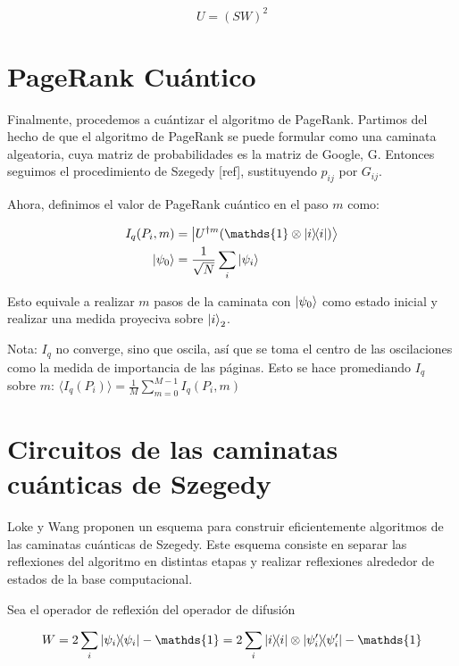 \begin{equation}
    U = (S W)^2
\end{equation}

\section{PageRank Cuántico}

Finalmente, procedemos a cuántizar el algoritmo de PageRank. Partimos del hecho de que el algoritmo de PageRank se puede formular como una caminata algeatoria, cuya matriz de probabilidades es la matriz de Google, G. Entonces seguimos el procedimiento de Szegedy [ref], sustituyendo $p_{i j}$ por $G_{i j}$.

Ahora, definimos el valor de PageRank cuántico en el paso $m$ como:

\color{red}
\begin{align*}
I_q(P_i,m) &= \ket{U^{\dagger m}(\mathds{1} \otimes \ketbra{i}{i})} \\
\ket{\psi_0} &= \frac{1}{\sqrt{N}} \sum\limits_i \ket{\psi_i}
\end{align*}
\color{black}

Esto equivale a realizar $m$ pasos de la caminata con $\ket{\psi_0}$ como estado inicial y realizar una medida proyeciva sobre $\ket{i}_2$.

Nota: $I_q$ no converge, sino que oscila, así que se toma el centro de las oscilaciones como la medida de importancia de las páginas. Esto se hace promediando $I_q$ sobre $m$: $\langle I_q(P_i) \rangle = \frac{1}{M} \sum\limits_{m=0}^{M-1} I_q(P_i,m)$ 

\section{Circuitos de las caminatas cuánticas de Szegedy}

Loke y Wang \cite{loke} proponen un esquema para construir eficientemente algoritmos de las caminatas cuánticas de Szegedy. Este esquema consiste en separar las reflexiones del algoritmo en distintas etapas y realizar reflexiones alrededor de estados de la base computacional.

Sea el operador de reflexión del operador de difusión

\begin{equation}
    W = 2 \sum\limits_i \ketbra{\psi_i}{\psi_i} - \mathds{1} = 2 \sum\limits_i \ketbra{i}{i} \otimes \ketbra{\psi_i^\prime}{\psi_i^\prime} - \mathds{1}
\end{equation}

